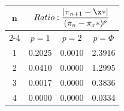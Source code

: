 \documentclass{article}
\providecommand{\abs}[1]{\lvert#1\rvert}
\begin{document}
\begin{tabular}{|c|c|c|c|}
\hline
\multirow{2}{*}{n} & \multicolumn{3}{|c|}{$Ratio:\displaystyle\frac{\abs{\pi_{n+1}-\x*}}{({\pi_{n}-\pi_x*})^p}$} \\
\cline{2-4}
 & $p=1$ & $p=2$ & $p=\Phi$ \\
\hline
 1 & 0.2025 & 0.0010 & 2.3916 \\ 
  2 & 0.0410 & 0.0000 & 1.2995 \\ 
  3 & 0.0017 & 0.0000 & 0.3836 \\ 
  4 & 0.0000 & 0.0000 & 0.0334 \\ 
 \hline 
\end{tabular}
\end{document}
